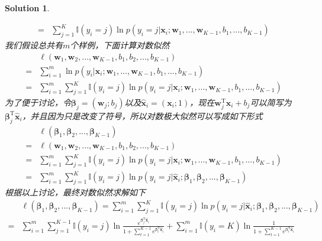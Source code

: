 \documentclass[a4paper,UTF8]{article}
\numberwithin{equation}{section}
\newtheorem*{solution}{Solution}
\begin{document}
\begin{solution}
\begin{enumerate}
\begin{equation}
\begin{aligned}
=& \sum_{j=1}^{K}\mathbb{I}(y_i=j)\ln p(y_i=j|\mathbf{x}_i;\mathbf{w}_1,...,\mathbf{w}_{K-1}, b_1,...,b_{K-1})
\end{aligned}
\end{equation}
我们假设总共有$m$个样例，下面计算对数似然
\begin{equation}
\begin{aligned}
&\ell(\mathbf{w}_1, \mathbf{w}_2,...,\mathbf{w}_{K-1}, b_1, b_2,...,b_{K-1})\\
=& \sum_{i=1}^{m}\ln p(y_i|\mathbf{x}_i;\mathbf{w}_1,...,\mathbf{w}_{K-1}, b_1,...,b_{K-1})\\
=& \sum_{i=1}^{m}\sum_{j=1}^{K}\mathbb{I}(y_i=j)\ln p(y_i=j|\mathbf{x}_i;\mathbf{w}_1,...,\mathbf{w}_{K-1}, b_1,...,b_{K-1})
\end{aligned}
\end{equation}
为了便于讨论，令$\boldsymbol{\beta}_j = (\mathbf{w}_j; b_j)$以及$\hat{\mathbf{x}}_i = (\mathbf{x}_i; 1)$，现在$\mathbf{w}_j^\mathrm{T}\mathbf{x}_i+b_j$可以简写为$\boldsymbol{\beta}_j^\mathrm{T}\hat{\mathbf{x}}_i$，并且因为只是改变了符号，所以对数极大似然可以写成如下形式
\begin{equation}
\begin{aligned}
&\ell(\boldsymbol{\beta}_1, \boldsymbol{\beta}_2,...,\boldsymbol{\beta}_{K-1})\\
=& \ell(\mathbf{w}_1, \mathbf{w}_2,...,\mathbf{w}_{K-1}, b_1, b_2,...,b_{K-1}) \\
=& \sum_{i=1}^{m}\sum_{j=1}^{K}\mathbb{I}(y_i=j)\ln p(y_i=j|\mathbf{x}_i;\mathbf{w}_1,...,\mathbf{w}_{K-1}, b_1,...,b_{K-1})\\
=&\sum_{i=1}^{m}\sum_{j=1}^{K}\mathbb{I}(y_i=j)\ln p(y_i=j|\hat{\mathbf{x}}_i;\boldsymbol{\beta}_1, \boldsymbol{\beta}_2,...,\boldsymbol{\beta}_{K-1})
\end{aligned}
\end{equation}
根据以上讨论，最终对数似然求解如下
\begin{equation}
\begin{aligned}
&\ell(\boldsymbol{\beta}_1, \boldsymbol{\beta}_2,...,\boldsymbol{\beta}_{K-1}) = \sum_{i=1}^{m}\sum_{j=1}^{K}\mathbb{I}(y_i=j)\ln p(y_i=j|\hat{\mathbf{x}}_i;\boldsymbol{\beta}_1, \boldsymbol{\beta}_2,...,\boldsymbol{\beta}_{K-1})\\
=& \sum_{i=1}^{m}\sum_{j=1}^{K-1}\mathbb{I}(y_i=j)\ln \frac{e^{\boldsymbol{\beta}_j^\mathrm{T}\hat{\mathbf{x}}_i}}{1 + \sum_{t=1}^{K-1}e^{\boldsymbol{\beta}_t^\mathrm{T}\hat{\mathbf{x}}_i}} + \sum_{i=1}^{m}\mathbb{I}(y_i=K)\ln\frac{1}{1 + \sum_{t=1}^{K-1}e^{\boldsymbol{\beta}_t^\mathrm{T}\hat{\mathbf{x}}_i}}\\

\end{aligned}
\end{equation}
\end{enumerate}
\end{solution}
\end{document}
